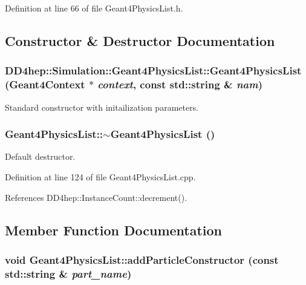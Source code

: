 Definition at line 66 of file Geant4PhysicsList.h.

\subsection{Constructor \& Destructor Documentation}
\hypertarget{class_d_d4hep_1_1_simulation_1_1_geant4_physics_list_aeadd72c30287f2dfc804c893f976ac9d}{
\subsubsection[{Geant4PhysicsList}]{\setlength{\rightskip}{0pt plus 5cm}DD4hep::Simulation::Geant4PhysicsList::Geant4PhysicsList ({\bf Geant4Context} $\ast$ {\em context}, \/  const std::string \& {\em nam})}}
\label{class_d_d4hep_1_1_simulation_1_1_geant4_physics_list_aeadd72c30287f2dfc804c893f976ac9d}


Standard constructor with initailization parameters. \hypertarget{class_d_d4hep_1_1_simulation_1_1_geant4_physics_list_a224e107987da2017407996766e9bd445}{
\subsubsection[{$\sim$Geant4PhysicsList}]{\setlength{\rightskip}{0pt plus 5cm}Geant4PhysicsList::$\sim$Geant4PhysicsList ()}}
\label{class_d_d4hep_1_1_simulation_1_1_geant4_physics_list_a224e107987da2017407996766e9bd445}


Default destructor. 

Definition at line 124 of file Geant4PhysicsList.cpp.

References DD4hep::InstanceCount::decrement().

\subsection{Member Function Documentation}
\hypertarget{class_d_d4hep_1_1_simulation_1_1_geant4_physics_list_ac4d76361cc1b439b42dc144a1e7fa988}{
\subsubsection[{addParticleConstructor}]{\setlength{\rightskip}{0pt plus 5cm}void Geant4PhysicsList::addParticleConstructor (const std::string \& {\em part\_\-name})}}
\label{class_d_d4hep_1_1_simulation_1_1_geant4_physics_list_ac4d76361cc1b439b42dc144a1e7fa988}


